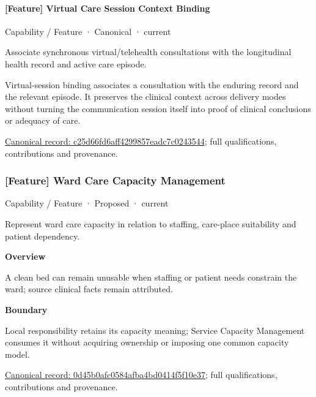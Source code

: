 \paragraph{[Feature] Virtual Care Session Context Binding}

\label{element:c25d66fd6aff4299857eadc7c0243544}
{\small Capability / Feature · Canonical · current}\par

Associate synchronous virtual/telehealth consultations with the longitudinal health record and active care episode.



Virtual-session binding associates a consultation with the enduring record and the relevant episode. It preserves the clinical context across delivery modes without turning the communication session itself into proof of clinical conclusions or adequacy of care.


{\footnotesize \href{../../../../continuum/strategy/capability/feature/c25d66fd6aff4299857eadc7c0243544.md}{Canonical record: c25d66fd6aff4299857eadc7c0243544}; full qualifications, contributions and provenance.}\par
\subsubsection{[Feature] Ward Care Capacity Management}

\label{element:0d45b0afc0584afba4bd0414f5f10e37}
{\small Capability / Feature · Proposed · current}\par

Represent ward care capacity in relation to staffing, care-place suitability and patient dependency.



\textbf{Overview}



A clean bed can remain unusable when staffing or patient needs constrain the ward; source clinical facts remain attributed.



\textbf{Boundary}



Local responsibility retains its capacity meaning; Service Capacity Management consumes it without acquiring ownership or imposing one common capacity model.


{\footnotesize \href{../../../../continuum/strategy/capability/feature/0d45b0afc0584afba4bd0414f5f10e37.md}{Canonical record: 0d45b0afc0584afba4bd0414f5f10e37}; full qualifications, contributions and provenance.}\par
